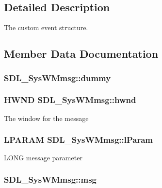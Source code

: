 \subsection{Detailed Description}
The custom event structure. 

\subsection{Member Data Documentation}
\hypertarget{struct_s_d_l___sys_w_mmsg_a8faf13f90f2477157b42b631308cd900}{
\subsubsection[{dummy}]{ S\-D\-L\-\_\-\-Sys\-W\-Mmsg\-::dummy}}\label{struct_s_d_l___sys_w_mmsg_a8faf13f90f2477157b42b631308cd900}
\hypertarget{struct_s_d_l___sys_w_mmsg_a55cf9583b5eddfe60a5c9851f9cce457}{
\subsubsection[{hwnd}]{\setlength{\rightskip}{0pt plus 5cm}H\-W\-N\-D S\-D\-L\-\_\-\-Sys\-W\-Mmsg\-::hwnd}}\label{struct_s_d_l___sys_w_mmsg_a55cf9583b5eddfe60a5c9851f9cce457}
The window for the message \hypertarget{struct_s_d_l___sys_w_mmsg_a24c1e4c3cb8d9781d34e5d99df66ac36}{
\subsubsection[{l\-Param}]{\setlength{\rightskip}{0pt plus 5cm}L\-P\-A\-R\-A\-M S\-D\-L\-\_\-\-Sys\-W\-Mmsg\-::l\-Param}}\label{struct_s_d_l___sys_w_mmsg_a24c1e4c3cb8d9781d34e5d99df66ac36}
L\-O\-N\-G message parameter \hypertarget{struct_s_d_l___sys_w_mmsg_a74894ed060d5508ab06aac584154d61e}{
\subsubsection[{msg}]{ S\-D\-L\-\_\-\-Sys\-W\-Mmsg\-::msg}}\label{struct_s_d_l___sys_w_mmsg_a74894ed060d5508ab06aac584154d61e}
